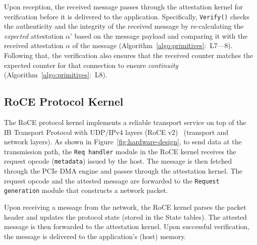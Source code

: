 Upon reception, the received message passes through the attestation kernel for verification before it is delivered to the application. Specifically, \texttt{Verify()} checks the authenticity and the integrity of the received message by re-calculating the {\em expected} attestation $\alpha$' based on the message payload and comparing it with the received attestation $\alpha$ of the message (Algorithm~\ref{algo:primitives}:~L7---8). Following that, the verification also ensures that the received counter matches the expected counter for that connection to ensure \emph{continuity} (Algorithm~\ref{algo:primitives}:~L8). 



\subsection{RoCE Protocol Kernel}
\label{subsec:roce_protocol_kernel}

The RoCE protocol kernel implements a reliable transport service on top of the IB Transport Protocol with UDP/IPv4 layers (RoCE v2)~\cite{infiniband} (transport and network layers). As shown in Figure~\ref{fig:hardware-design}, to send data at the transmission path, the {\tt Req handler} module in the RoCE kernel receives the request opcode ({\tt metadata}) issued by the host. The message is then fetched through the PCIe DMA engine and passes through the attestation kernel. The request opcode and the attested message are forwarded to the {\tt Request generation} module that constructs a network packet. 

Upon receiving a message from the network, the RoCE kernel parses the packet header and updates the protocol state (stored in the State tables). The attested message is then forwarded to the attestation kernel. Upon successful verification, the message is delivered to the application's (host) memory. 

